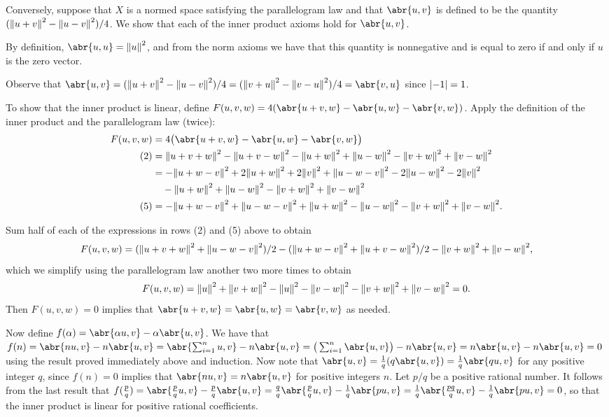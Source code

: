 \documentclass[11pt]{article}
\begin{document}
\begin{enumerate}[label=\textbf{\arabic*.}]
    Conversely, suppose that $X$ is a normed space satisfying the parallelogram law and that $\abr{u,v}$ is defined to be the quantity $(\norm{u+v}^2 - \norm{u-v}^2)/4$. We show that each of the inner product axioms hold for $\abr{u,v}$.
    
    By definition, $\abr{u,u} = \norm{u}^2$, and from the norm axioms we have that this quantity is nonnegative and is equal to zero if and only if $u$ is the zero vector.

    Observe that $\abr{u,v} = (\norm{u+v}^2 - \norm{u-v}^2)/4 = (\norm{v+u}^2 - \norm{v-u}^2)/4 = \abr{v,u}$ since $\abs{-1} = 1$.

    To show that the inner product is linear, define $F(u,v,w) = 4(\abr{u+v,w} - \abr{u,w} - \abr{v,w})$. Apply the definition of the inner product and the parallelogram law (twice):
    \begin{align*}
        F(u,v,w) &= 4\big(\abr{u+v,w} - \abr{u,w} - \abr{v,w}\big)\\
        (2) &= \norm{u+v+w}^2 - \norm{u+v-w}^2 - \norm{u+w}^2 + \norm{u-w}^2 - \norm{v+w}^2 +\norm{v-w}^2\\
        &= -\norm{u+w-v}^2 + 2\norm{u+w}^2 + 2\norm{v}^2 + \norm{u-w-v}^2 - 2\norm{u-w}^2 - 2\norm{v}^2\\
        &\hspace{1em}- \norm{u+w}^2 + \norm{u-w}^2 - \norm{v+w}^2 +\norm{v-w}^2 \\
        (5) &= -\norm{u+w-v}^2 + \norm{u-w-v}^2 + \norm{u+w}^2 - \norm{u-w}^2 - \norm{v+w}^2 +\norm{v-w}^2 .
    \end{align*}

    Sum half of each of the expressions in rows (2) and (5) above to obtain \[F(u,v,w) = (\norm{u+v+w}^2 + \norm{u-w-v}^2)/2 - (\norm{u+w-v}^2 + \norm{u+v-w}^2)/2 - \norm{v+w}^2 +\norm{v-w}^2,\] which we simplify using the parallelogram law another two more times to obtain 
    \[F(u,v,w) = \norm{u}^2 + \norm{v+w}^2 - \norm{u}^2 - \norm{v-w}^2- \norm{v+w}^2 +\norm{v-w}^2 = 0.\] Then $F(u,v,w) = 0$ implies that $\abr{u+v,w} = \abr{u,w} = \abr{v,w}$ as needed.

    Now define $f(\alpha) = \abr{\alpha u, v}-\alpha\abr{u,v}$. We have that $f(n) = \abr{nu,v}-n\abr{u,v} = \abr{\sum_{i=1}^n u,v}-n\abr{u,v} = \big(\sum_{i=1}^n \abr{u,v}\big)-n\abr{u,v} = n\abr{u,v}-n\abr{u,v}=0$ using the result proved immediately above and induction. Now note that $\abr{u,v} = \frac{1}{q}(q\abr{u,v}) = \frac{1}{q}\abr{qu,v}$ for any positive integer $q$, since $f(n) = 0$ implies that $\abr{nu,v} = n\abr{u,v}$ for positive integers $n$. Let $p/q$ be a positive rational number. It follows from the last result that $f(\frac{p}{q}) = \abr{\frac{p}{q} u, v}-\frac{p}{q}\abr{u,v} = \frac{q}{q}\abr{\frac{p}{q} u, v}-\frac{1}{q}\abr{pu,v} = \frac{1}{q}\abr{\frac{pq}{q} u, v}-\frac{1}{q}\abr{pu,v} = 0$, so that the inner product is linear for positive rational coefficients. 


\end{enumerate}
\end{document}
